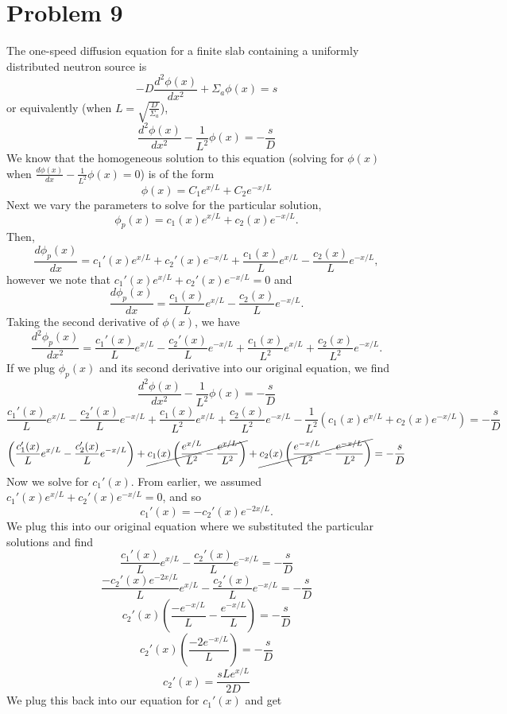 \documentclass{article}
\begin{document}

\section*{Problem 9}

The one-speed diffusion equation for a finite slab containing a uniformly distributed neutron source is 
$$ -D\frac{d^2\phi(x)}{dx^2} + \Sigma_a\phi(x) = s $$
or equivalently (when $L = \sqrt{\frac{D}{\Sigma_a}}$),
$$ \frac{d^2\phi(x)}{dx^2} - \frac{1}{L^2}\phi(x) = -\frac{s}{D} $$
We know that the homogeneous solution to this equation (solving for $\phi(x)$ when $\frac{d\phi(x)}{dx} - \frac{1}{L^2}\phi(x) = 0$) is of the form
$$ \phi(x) = C_1e^{x/L} + C_2e^{-x/L} $$
Next we vary the parameters to solve for the particular solution,
$$ \phi_p(x) = c_1(x)e^{x/L} + c_2(x)e^{-x/L} .$$
Then,
$$ \frac{d\phi_p(x)}{dx} = c_1'(x)e^{x/L} + c_2'(x)e^{-x/L} + \frac{c_1(x)}{L}e^{x/L} - \frac{c_2(x)}{L}e^{-x/L}, $$
however we note that $c_1'(x)e^{x/L} + c_2'(x)e^{-x/L} = 0$ and 
$$ \frac{d\phi_p(x)}{dx} = \frac{c_1(x)}{L}e^{x/L} - \frac{c_2(x)}{L}e^{-x/L}. $$
Taking the second derivative of $\phi(x)$, we have
$$ \frac{d^2\phi_p(x)}{dx^2} = \frac{c_1'(x)}{L}e^{x/L} - \frac{c_2'(x)}{L}e^{-x/L} + \frac{c_1(x)}{L^2}e^{x/L} + \frac{c_2(x)}{L^2}e^{-x/L}. $$
If we plug $\phi_p(x)$ and its second derivative into our original equation, we find
$$ \frac{d^2\phi(x)}{dx^2} - \frac{1}{L^2}\phi(x) = -\frac{s}{D} $$
$$ \frac{c_1'(x)}{L}e^{x/L} - \frac{c_2'(x)}{L}e^{-x/L} + \frac{c_1(x)}{L^2}e^{x/L} + \frac{c_2(x)}{L^2}e^{-x/L} - \frac{1}{L^2}\left(c_1(x)e^{x/L} + c_2(x)e^{-x/L}\right) = -\frac{s}{D} $$
$$ \left(\frac{c_1'(x)}{L}e^{x/L} - \frac{c_2'(x)}{L}e^{-x/L}\right) + \cancel{c_1(x) \left( \frac{e^{x/L}}{L^2} - \frac{e^{x/L}}{L^2}\right)} + \cancel{c_2(x) \left( \frac{e^{-x/L}}{L^2} - \frac{e^{-x/L}}{L^2}\right)} = -\frac{s}{D} $$
Now we solve for $c_1'(x)$. From earlier, we assumed $c_1'(x)e^{x/L} + c_2'(x)e^{-x/L} = 0$, and so
$$ c_1'(x) = -c_2'(x)e^{-2x/L} .$$
We plug this into our original equation where we substituted the particular solutions and find
$$ \frac{c_1'(x)}{L}e^{x/L} - \frac{c_2'(x)}{L}e^{-x/L} = -\frac{s}{D} $$
$$ \frac{-c_2'(x)e^{-2x/L}}{L}e^{x/L} - \frac{c_2'(x)}{L}e^{-x/L} = -\frac{s}{D} $$
$$ c_2'(x)\left(\frac{-e^{-x/L}}{L} - \frac{e^{-x/L}}{L}\right) = -\frac{s}{D} $$
$$ c_2'(x)\left(\frac{-2e^{-x/L}}{L}\right) = -\frac{s}{D} $$
$$ c_2'(x) = \frac{sLe^{x/L}}{2D} $$
We plug this back into our equation for $c_1'(x)$ and get
\end{document}
